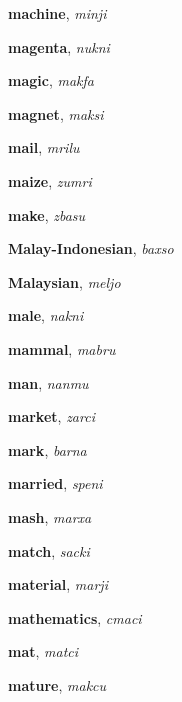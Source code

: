 \documentclass[12pt]{book}
\begin{document}
\begin{description}

\item[ ] \textbf{machine}, \textit{minji}

\item[ ] \textbf{magenta}, \textit{nukni}

\item[ ] \textbf{magic}, \textit{makfa}

\item[ ] \textbf{magnet}, \textit{maksi}

\item[ ] \textbf{mail}, \textit{mrilu}

\item[ ] \textbf{maize}, \textit{zumri}

\item[ ] \textbf{make}, \textit{zbasu}

\item[ ] \textbf{Malay-Indonesian}, \textit{baxso}

\item[ ] \textbf{Malaysian}, \textit{meljo}

\item[ ] \textbf{male}, \textit{nakni}

\item[ ] \textbf{mammal}, \textit{mabru}

\item[ ] \textbf{man}, \textit{nanmu}

\item[ ] \textbf{market}, \textit{zarci}

\item[ ] \textbf{mark}, \textit{barna}

\item[ ] \textbf{married}, \textit{speni}

\item[ ] \textbf{mash}, \textit{marxa}

\item[ ] \textbf{match}, \textit{sacki}

\item[ ] \textbf{material}, \textit{marji}

\item[ ] \textbf{mathematics}, \textit{cmaci}

\item[ ] \textbf{mat}, \textit{matci}

\item[ ] \textbf{mature}, \textit{makcu}


\end{description}
\end{document}
